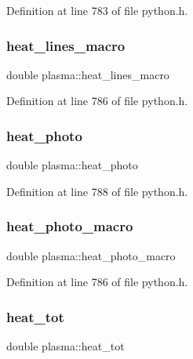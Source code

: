 Definition at line 783 of file python.\+h.

\mbox{\label{structplasma_a819b893417ac6c5e2e572dec2f361ac5}} 
\subsubsection{\texorpdfstring{heat\+\_\+lines\+\_\+macro}{heat\_lines\_macro}}
{\footnotesize\ttfamily double plasma\+::heat\+\_\+lines\+\_\+macro}



Definition at line 786 of file python.\+h.

\mbox{\label{structplasma_a2878212449ef25989225a975f81679fd}} 
\subsubsection{\texorpdfstring{heat\+\_\+photo}{heat\_photo}}
{\footnotesize\ttfamily double plasma\+::heat\+\_\+photo}



Definition at line 788 of file python.\+h.

\mbox{\label{structplasma_ad926ff3d325d177b1d767e2a929b6899}} 
\subsubsection{\texorpdfstring{heat\+\_\+photo\+\_\+macro}{heat\_photo\_macro}}
{\footnotesize\ttfamily double plasma\+::heat\+\_\+photo\+\_\+macro}



Definition at line 786 of file python.\+h.

\mbox{\label{structplasma_a2ed3e67409c1f55ca66cb0cbfbc39ac2}} 
\subsubsection{\texorpdfstring{heat\+\_\+tot}{heat\_tot}}
{\footnotesize\ttfamily double plasma\+::heat\+\_\+tot}



